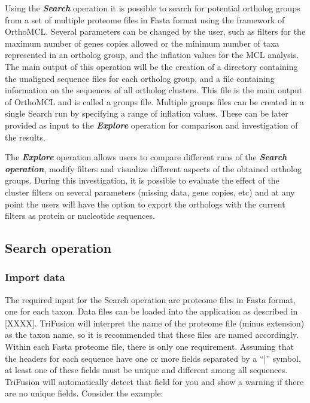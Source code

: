 \documentclass[12pt]{article}
\begin{document}
Using the \textbf{\textit{Search}} operation it is possible to search for potential ortholog groups from a set of multiple proteome files in Fasta format using the framework of OrthoMCL. Several parameters can be changed by the user, such as filters for the maximum number of genes copies allowed or the minimum number of taxa represented in an ortholog group, and the inflation values for the MCL analysis. The main output of this operation will be the creation of a directory containing the unaligned sequence files for each ortholog group, and a file containing information on the sequences of all ortholog clusters. This file is the main output of OrthoMCL and is called a groups file. Multiple groups files can be created in a single Search run by specifying a range of inflation values. These can be later provided as input to the \textit{\textbf{Explore}} operation for comparison and investigation of the results.

The \textbf{\textit{Explore}} operation allows users to compare different runs of the \textbf{\textit{Search operation}}, modify filters and visualize different aspects of the obtained ortholog groups. During this investigation, it is possible to evaluate the effect of the cluster filters on several parameters (missing data, gene copies, etc) and at any point the users will have the option to export the orthologs with the current filters as protein or nucleotide sequences.

\subsection{Search operation}

\subsubsection{Import data}

The required input for the Search operation are proteome files in Fasta format, one for
each taxon. Data files can be loaded into the application as described in [XXXX]. 
TriFusion will interpret the name of the proteome file (minus extension) as
the taxon name, so it is recommended that these files are named accordingly. Within each
Fasta proteome file, there is only one requirement. Assuming that the headers for each
sequence have one or more fields separated by a ``|'' symbol, at least one of these fields
must be unique and different among all sequences.  TriFusion will automatically detect
that field for you and show a warning if there are no unique fields. Consider the example:
\end{document}
